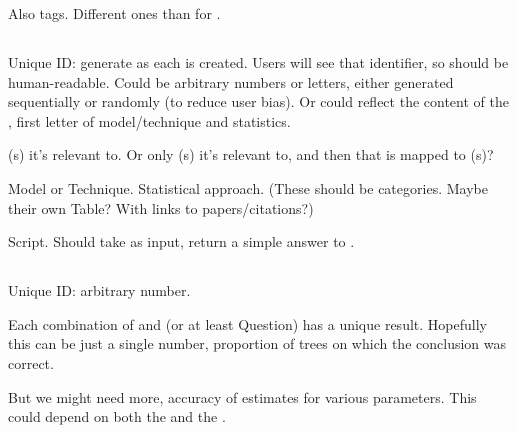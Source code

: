 Also tags.  Different ones than for \Trees.

\subsection{\Method}

Unique ID: generate as each \Method is created.
Users will see that identifier, so should be human-readable.
Could be arbitrary numbers or letters, either generated sequentially or randomly (to reduce user bias).
Or could reflect the content of the \Method, \eg first letter of model/technique and statistics.

\Task(s) it's relevant to.
Or only \Refset(s) it's relevant to, and then that is mapped to \Task(s)?

Model or Technique.
Statistical approach.
(These should be categories.  Maybe their own Table?  With links to papers/citations?)

Script.
Should take \Element as input, return a simple answer to \Task.

\subsection{\Performance}

Unique ID: arbitrary number.

Each combination of \Method and \Task (or at least Question) has a unique \Performance result.
Hopefully this can be just a single number, \eg proportion of trees on which the conclusion was correct.

But we might need more, \eg accuracy of estimates for various parameters.
This could depend on both the \Method and the \Question.

% 
% 
% 
% 
% 
